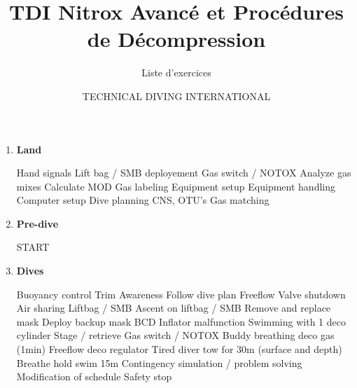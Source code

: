 \documentclass[english,11pt,a4paper]{article}
\title{TDI Nitrox Avancé et Procédures de Décompression}
\subtitle{Liste d'exercices}
\author{TECHNICAL DIVING INTERNATIONAL}
\begin{document}


	
\begin{enumerate}
	\item \textbf{Land}
	\begin{multicols}{2}
		\begin{outline}
				\1 Hand signals
				\1 Lift bag / SMB deployement
				\1 Gas switch / NOTOX
				\vspace{1em}
				\1 Analyze gas mixes
				\1 Calculate MOD
				\1 Gas labeling
				\vspace{1em}
				\1 Equipment setup
				\1 Equipment handling
				\1 Computer setup
				\vspace{1em}
				\1 Dive planning
				\1 CNS, OTU's
				\1 Gas matching
		\end{outline}
	\end{multicols}
	
	\item \textbf{Pre-dive}
	\begin{outline}
			\1 START
	\end{outline}
	
	\item \textbf{Dives}
	\begin{multicols}{2}
		\begin{outline}
				\1 Buoyancy control
				\1 Trim
				\1 Awareness
				\1 Follow dive plan
				\vspace{1em}
				\1 Freeflow
				\1 Valve shutdown
				\1 Air sharing
				\vspace{1em}
				\1 Liftbag / SMB
				\1 Ascent on liftbag / SMB
				\vspace{1em}
				\1 Remove and replace mask
				\1 Deploy backup mask
				\vspace{1em}
				\1 BCD Inflator malfunction
				\vspace{1em}
				\1 Swimming with 1 deco cylinder
				\1 Stage / retrieve
				\1 Gas switch / NOTOX
				\vspace{1em}
				\1 Buddy breathing deco gas (1min)
				\1 Freeflow deco regulator
				\1 Tired diver tow for 30m (surface and depth)
				\1 Breathe hold swim 15m
				\vspace{1em}
				\1 Contingency simulation / problem solving
				\1 Modification of schedule
				\vspace{1em}
				\1 Safety stop
		\end{outline}
	\end{multicols}
	

\end{enumerate}
\end{document}
